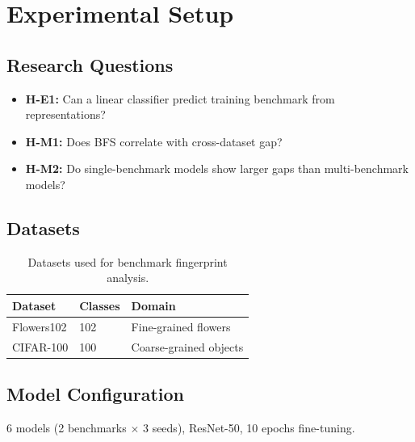 \section{Experimental Setup}
\label{sec:setup}

\subsection{Research Questions}

\begin{itemize}
    \item \textbf{H-E1:} Can a linear classifier predict training benchmark from representations?
    \item \textbf{H-M1:} Does BFS correlate with cross-dataset gap?
    \item \textbf{H-M2:} Do single-benchmark models show larger gaps than multi-benchmark models?
\end{itemize}

\subsection{Datasets}

\begin{table}[h]
\centering
\begin{tabular}{@{}lll@{}}
\toprule
Dataset & Classes & Domain \\
\midrule
Flowers102 & 102 & Fine-grained flowers \\
CIFAR-100 & 100 & Coarse-grained objects \\
\bottomrule
\end{tabular}
\caption{Datasets used for benchmark fingerprint analysis.}
\label{tab:datasets}
\end{table}

\subsection{Model Configuration}

6 models (2 benchmarks $\times$ 3 seeds), ResNet-50, 10 epochs fine-tuning.
